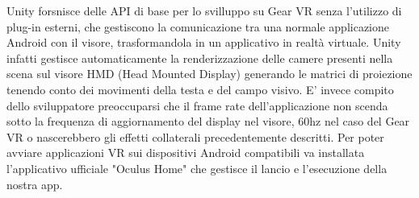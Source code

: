 Unity forsnisce delle API di base per lo svilluppo su Gear VR senza l'utilizzo di plug-in esterni, che gestiscono la comunicazione tra una normale applicazione Android con il visore, trasformandola in un applicativo in realtà virtuale. Unity infatti gestisce automaticamente la renderizzazione delle camere presenti nella scena sul visore HMD (Head Mounted Display) generando le matrici di proiezione tenendo conto dei movimenti della testa e del campo visivo. E' invece compito dello sviluppatore preoccuparsi che il frame rate dell'applicazione non scenda sotto la frequenza di aggiornamento del display nel visore, 60hz nel caso del Gear VR o nascerebbero gli effetti collaterali precedentemente descritti. 
Per poter avviare applicazioni VR sui dispositivi Android compatibili va installata l'applicativo ufficiale "Oculus Home" che gestisce il lancio e l'esecuzione della nostra app.

 

 




